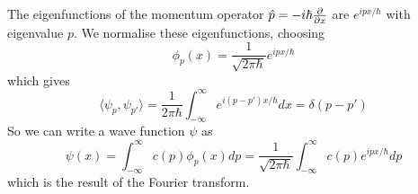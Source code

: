\begin{example}
	The eigenfunctions of the momentum operator $\hat{p} = -i \hbar \diffp{}{x}$ are $e^{ipx / \hbar}$ with eigenvalue $p$. We normalise these eigenfunctions, choosing
	\[
		\phi_p(x) = \frac{1}{\sqrt{2 \pi \hbar}} e^{ipx / \hbar}
	\]
	which gives
	\[
		\langle \psi_p, \psi_{p'} \rangle = \frac{1}{2 \pi \hbar} \int_{-\infty}^{\infty} e^{i(p - p')x / \hbar} dx = \delta(p - p')
	\]
	So we can write a wave function $\psi$ as
	\[
		\psi(x) = \int_{-\infty}^{\infty} c(p) \phi_p(x) dp = \frac{1}{\sqrt{2 \pi \hbar}} \int_{-\infty}^{\infty} c(p) e^{ipx / \hbar} dp
	\]
	which is the result of the Fourier transform.
\end{example}

